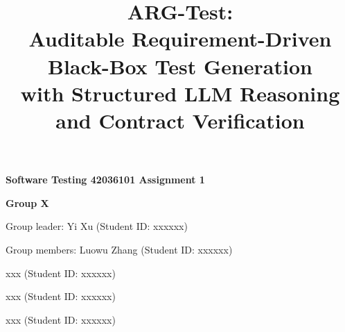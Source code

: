\documentclass{article}
\title{ARG-Test:\\
Auditable Requirement-Driven Black-Box Test Generation\\
with Structured LLM Reasoning and Contract Verification}
\author{}
\begin{document}
\pagestyle{plain}
\begin{titlepage}
\thispagestyle{plain}
\centering
\vspace*{\fill}
{\LARGE\bf Software Testing 42036101 Assignment 1\par}
\vspace{0.55in}
{\Large\bf Group X\par}
\vspace{0.9in}
{\large Group leader: Yi Xu (Student ID: xxxxxx)\par}
\vspace{0.18in}
{\large Group members: Luowu Zhang (Student ID: xxxxxx)\par}
\vspace{0.12in}
{\large xxx (Student ID: xxxxxx)\par}
\vspace{0.12in}
{\large xxx (Student ID: xxxxxx)\par}
\vspace{0.12in}
{\large xxx (Student ID: xxxxxx)\par}
\vspace*{\fill}
\end{titlepage}
\clearpage
\setcounter{page}{2}
\maketitle
\end{document}
